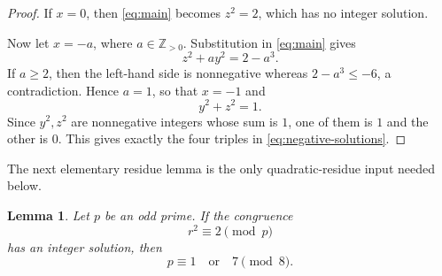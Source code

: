 \documentclass[a4paper,11pt]{amsart}
\numberwithin{equation}{section}
\newtheorem{lemma}[theorem]{Lemma}
\theoremstyle{definition}
\theoremstyle{remark}
\newcommand{\Z}{\mathbb Z}
\begin{document}
\begin{proof}
If \(x=0\), then \eqref{eq:main} becomes \(z^2=2\), which has no integer
solution.

Now let \(x=-a\), where \(a\in\Z_{>0}\).  Substitution in
\eqref{eq:main} gives
\begin{equation}\label{eq:negative-x}
 z^2+ay^2=2-a^3.
\end{equation}
If \(a\geq2\), then the left-hand side is nonnegative whereas
\(2-a^3\leq-6\), a contradiction.  Hence \(a=1\), so that \(x=-1\) and
\begin{equation}\label{eq:unit-circle-integral}
 y^2+z^2=1.
\end{equation}
Since \(y^2,z^2\) are nonnegative integers whose sum is \(1\), one of them
is \(1\) and the other is \(0\).  This gives exactly the four triples in
\eqref{eq:negative-solutions}.
\end{proof}

The next elementary residue lemma is the only quadratic-residue input needed
below.

\begin{lemma}\label{lem:two-residue}
Let \(p\) be an odd prime.  If the congruence
\begin{equation}\label{eq:two-square-mod-p}
 r^2\equiv2\pmod p
\end{equation}
has an integer solution, then
\begin{equation}\label{eq:pmod8}
 p\equiv1\quad\text{or}\quad7\pmod8.
\end{equation}
\end{lemma}
\end{document}
